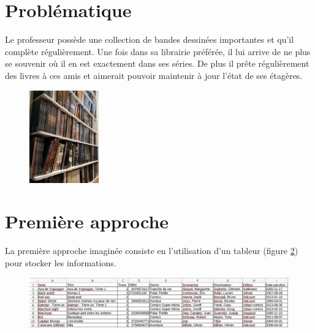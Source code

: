\documentclass[a4paper,11pt]{article}
\begin{document}
\begin{Form}
\section{Problématique}
Le professeur possède une collection de bandes dessinées importantes et qu'il complète régulièrement. Une fois dans sa librairie préférée, il lui arrive de ne plus se souvenir où il en est exactement dans ses séries. De plus il prête régulièrement des livres à ces amis et aimerait pouvoir maintenir à jour l'état de ses étagères.
\begin{figure}[!h]
\centering
\includegraphics[width=3cm]{ressources/biblio.jpg}
\label{biblio}
\end{figure}

\begin{center}
\end{center}
\section{Première approche}
La première approche imaginée consiste en l'utilisation d'un tableur (figure \ref{tableur}) pour stocker les informations.
\begin{figure}[!h]
\centering
\includegraphics[width=15cm]{ressources/approche-1.png}
\label{tableur}
\end{figure}


\end{Form}
\end{document}
